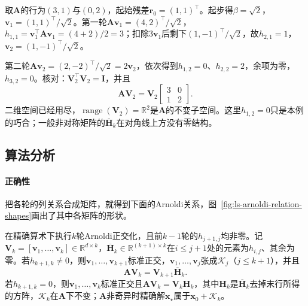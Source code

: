 \begin{example}[二阶非对称矩阵上的Arnoldi正交化]
\label{ex:ls-arnoldi-two-steps}
取$\bm A$的行为$(3,1)$与$(0,2)$，起始残差$\bm r_0=(1,1)^\top$。起步得$\beta=\sqrt2$，$\bm v_1=(1,1)^\top/\sqrt2$。第一轮$\bm A\bm v_1=(4,2)^\top/\sqrt2$，$h_{1,1}=\bm v_1^\top\bm A\bm v_1=(4+2)/2=3$；扣除$3\bm v_1$后剩下$(1,-1)^\top/\sqrt2$，故$h_{2,1}=1$，$\bm v_2=(1,-1)^\top/\sqrt2$。

第二轮$\bm A\bm v_2=(2,-2)^\top/\sqrt2=2\bm v_2$，依次得到$h_{1,2}=0$、$h_{2,2}=2$，余项为零，$h_{3,2}=0$。核对：$\bm V_2^\top\bm V_2=\bm I$，并且
\[
 \bm A\bm V_2=\bm V_2\begin{bmatrix}3&0\\1&2\end{bmatrix}.
\]
二维空间已经用尽，$\operatorname{range}(\bm V_2)=\mathbb R^2$是$\bm A$的不变子空间。这里$h_{1,2}=0$只是本例的巧合；一般非对称矩阵的$\overline{\bm H}_k$在对角线上方没有零结构。
\end{example}

\subsection{算法分析}

\paragraph{正确性}
把各轮的列关系合成矩阵，就得到下面的Arnoldi关系，图~\ref{fig:ls-arnoldi-relation-shapes}画出了其中各矩阵的形状。

\begin{theorem}[Arnoldi关系]
\label{thm:ls-arnoldi-relation}
在精确算术下执行$k$轮Arnoldi正交化，且前$k-1$轮的$h_{j+1,j}$均非零。记$\bm V_k=[\bm v_1,\ldots,\bm v_k]\in\mathbb R^{d\times k}$，$\overline{\bm H}_k\in\mathbb R^{(k+1)\times k}$在$i\le j+1$处的元素为$h_{i,j}$、其余为零。若$h_{k+1,k}\ne0$，则$\bm v_1,\ldots,\bm v_{k+1}$标准正交，$\bm v_1,\ldots,\bm v_j$张成$\mathcal K_j$（$j\le k+1$），并且
\begin{equation}
 \label{eq:ls-arnoldi-relation}
 \bm A\bm V_k=\bm V_{k+1}\overline{\bm H}_k .
\end{equation}
若$h_{k+1,k}=0$，则$\bm v_1,\ldots,\bm v_k$标准正交且$\bm A\bm V_k=\bm V_k\bm H_k$，其中$\bm H_k$是$\overline{\bm H}_k$去掉末行所得的方阵，$\mathcal K_k$在$\bm A$下不变；$\bm A$非奇异时精确解$\bm x_\star$属于$\bm x_0+\mathcal K_k$。
\end{theorem}


